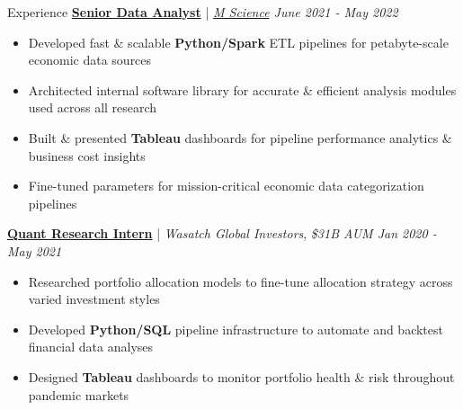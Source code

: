 \documentclass{resume/resume}
\begin{document}
\begin{rSection}{Experience}
  \href{https://mscience.com/}{\bf Senior Data Analyst} | {\em \href{https://mscience.com}{M Science} \hfill June 2021 - May 2022}
  \vspace{-6pt}
  \begin{itemize}[nosep]
    \item Developed fast \& scalable {\bf Python/Spark} ETL pipelines for petabyte-scale economic data sources
    \item Architected internal software library for accurate \& efficient analysis modules used across all research
    \item Built \& presented {\bf Tableau} dashboards for pipeline performance analytics \& business cost insights
    \item Fine-tuned parameters for mission-critical economic data categorization pipelines
  \end{itemize}

  \href{https://wasatchglobal.com/}{\bf Quant Research Intern} | {\em Wasatch Global Investors}, {\em \$31B AUM \hfill Jan 2020 - May 2021}
  \vspace{-6pt}
  \begin{itemize}[nosep]
    \item Researched portfolio allocation models to fine-tune allocation strategy across varied investment styles
    \item Developed {\bf Python/SQL} pipeline infrastructure to automate and backtest financial data analyses
    \item Designed {\bf Tableau} dashboards to monitor portfolio health \& risk throughout pandemic markets
  \end{itemize}


\end{rSection}
\end{document}
